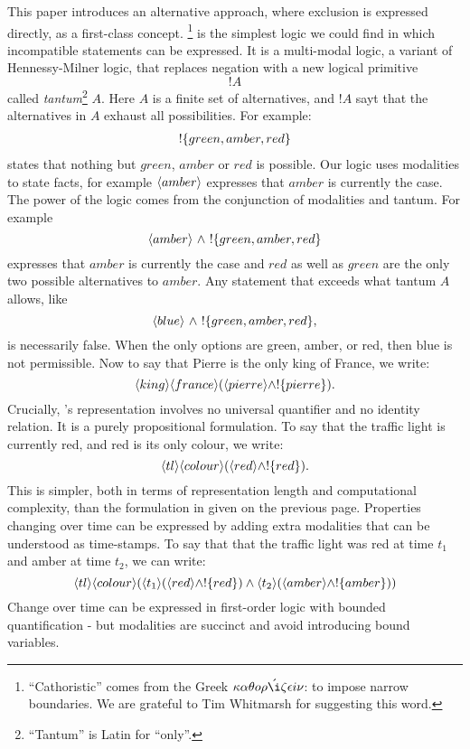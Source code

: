 This paper introduces an alternative approach, where
exclusion is expressed directly, as a first-class concept.
 \Cathoristic{}\footnote{``Cathoristic'' comes from the Greek
  $\kappa \alpha \theta o \rho \acute{\i} \zeta \epsilon i \nu$: to impose narrow
  boundaries. We are grateful to Tim Whitmarsh for suggesting this
  word.} is the simplest logic we could find in which incompatible
statements can be expressed.  
It is a multi-modal logic, a variant of Hennessy-Milner logic,
that replaces negation with a new logical primitive
\[
   !A
\]
called \emph{tantum}\footnote{``Tantum'' is Latin for ``only''.}
$A$. Here $A$ is a finite set of alternatives, and $!A$ sayt that the
alternatives in $A$ exhaust all possibilities.  For example:
\begin{eqnarray*}
! \{green, amber, red\}
\end{eqnarray*}
states that nothing but $green$, $amber$ or $red$ is possible.  Our
logic uses modalities to state facts, for example $\langle amber \rangle$
expresses that $amber$ is currently the case.  The power of the logic
comes from the conjunction of modalities and tantum. For example
\[
   \langle amber \rangle\ \land\ !\{green, amber, red\} 
\]
expresses that $amber$ is currently the case and $red$ as well as
$green$ are the only two possible alternatives to $amber$.  Any
statement that exceeds what tantum $A$ allows, like
\[
   \langle blue \rangle \ \land\ !\{green, amber, red\},
\]
is necessarily false.  When the only options are green, amber, or red,
then blue is not permissible.  Now to say that Pierre is the only king
of France, we write:
\[
\langle king \rangle \langle france \rangle (\langle pierre \rangle \land ! \{pierre\}).
\]
Crucially, \cathoristic{}'s representation involves no
universal quantifier and no identity relation.  It is a purely
propositional formulation.  To say that the traffic
light is currently red, and red is its only colour, we write:
\[
\langle tl \rangle \langle colour \rangle (\langle red \rangle \land !\{red\}).
\]
This is simpler, both in terms of representation length and
computational complexity, than the formulation in \fol{} given on the
previous page.
Properties changing over time can be expressed by adding extra
modalities that can be understood as time-stamps.  To say that that
the traffic light was red at time $t_1$ and amber at time $t_2$, we
can write:
\[
   \langle tl \rangle \langle colour \rangle (\langle t_1 \rangle (\langle red \rangle \land !\{red\}) \land \langle t_2 \rangle (\langle amber \rangle \land !\{amber\}))
\]
Change over time can be expressed in first-order logic with bounded
quantification - but modalities are succinct and avoid introducing
bound variables.

